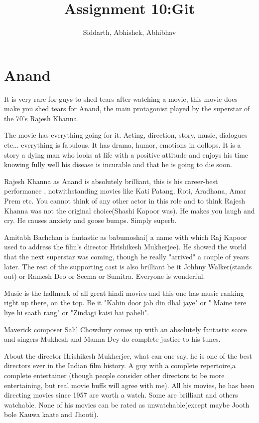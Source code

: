 \documentclass{article}
\title{Assignment 10:Git}
\author{Siddarth, Abhishek, Abhibhav}
\begin{document}
\maketitle
\section{Anand}
It is very rare for guys to shed tears after watching a movie, this movie does make you shed tears for Anand, the main protagonist played by the superstar of the 70's Rajesh Khanna.

The movie has everything going for it. Acting, direction, story, music, dialogues etc... everything is fabulous. It has drama, humor, emotions in dollops. It is a story a dying man who looks at life with a positive attitude and enjoys his time knowing fully well his disease is incurable and that he is going to die soon.

Rajesh Khanna as Anand is absolutely brilliant, this is his career-best performance , notwithstanding movies like Kati Patang, Roti, Aradhana, Amar Prem etc. You cannot think of any other actor in this role and to think Rajesh Khanna was not the original choice(Shashi Kapoor was). He makes you laugh and cry. He causes anxiety and goose bumps. Simply superb.

Amitabh Bachchan is fantastic as babumoshai( a name with which Raj Kapoor used to address the film's director Hrishikesh Mukherjee). He showed the world that the next superstar was coming, though he really "arrived" a couple of years later. The rest of the supporting cast is also brilliant be it Johhny Walker(stands out) or Ramesh Deo or Seema or Sumitra. Everyone is wonderful.

Music is the hallmark of all great hindi movies and this one has music ranking right up there, on the top. Be it "Kahin door jab din dhal jaye" or " Maine tere liye hi saath rang" or "Zindagi kaisi hai paheli".

Maverick composer Salil Chowdury comes up with an absolutely fantastic score and singers Mukhesh and Manna Dey do complete justice to his tunes.

About the director Hrishikesh Mukherjee, what can one say, he is one of the best directors ever in the Indian film history. A guy with a complete repertoire,a complete entertainer (though people consider other directors to be more entertaining, but real movie buffs will agree with me). All his movies, he has been directing movies since 1957 are worth a watch. Some are brilliant and others watchable. None of his movies can be rated as unwatchable(except maybe Jooth bole Kauwa kaate and Jhooti).
\end{document}
